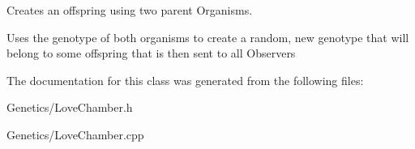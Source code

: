 Creates an offspring using two parent Organisms. 

Uses the genotype of both organisms to create a random, new genotype that will belong to some offspring that is then sent to all Observers 

The documentation for this class was generated from the following files\+:\begin{DoxyCompactItemize}
\item 
Genetics/Love\+Chamber.\+h\item 
Genetics/Love\+Chamber.\+cpp\end{DoxyCompactItemize}
